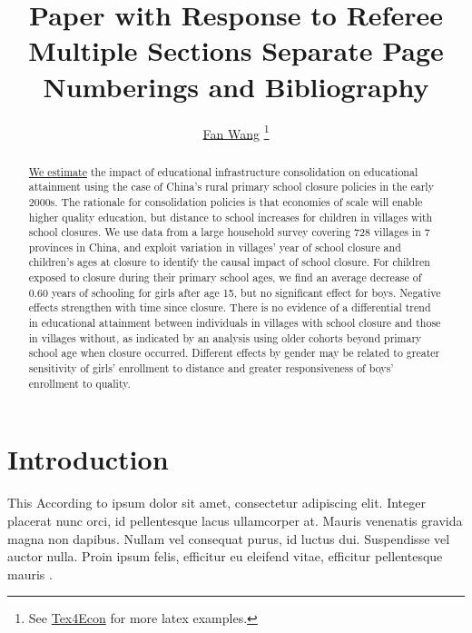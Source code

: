 \documentclass[12pt,english]{article}
\begin{document}
\title{Paper with Response to Referee\\Multiple Sections Separate Page Numberings and Bibliography}

\author{\href{http://fanwangecon.github.io/}{Fan Wang} \thanks{See \href{https://fanwangecon.github.io/Tex4Econ/}{Tex4Econ} for more latex examples.}}


\maketitle
\begin{abstract}
\singlespacing \href{https://papers.ssrn.com/sol3/papers.cfm?abstract_id=3140132}{We estimate} the impact of educational infrastructure consolidation on educational attainment using the case of China’s rural primary school closure policies in the early 2000s. The rationale for consolidation policies is that economies of scale will enable higher quality education, but distance to school increases for children in villages with school closures. We use data from a large household survey covering 728 villages in 7 provinces in China, and exploit variation in villages’ year of school closure and children’s ages at closure to identify the causal impact of school closure. For children exposed to closure during their primary school ages, we find an average decrease of 0.60 years of schooling for girls after age 15, but no significant effect for boys. Negative effects strengthen with time since closure. There is no evidence of a differential trend in educational attainment between individuals in villages with school closure and those in villages without, as indicated by an analysis using older cohorts beyond primary school age when closure occurred. Different effects by gender may be related to greater sensitivity of girls’ enrollment to distance and greater responsiveness of boys’ enrollment to quality.\end{abstract}
\vfill
\pagebreak{}

\section{Introduction}

This According to ipsum dolor sit amet, consectetur adipiscing elit. Integer placerat nunc orci, id pellentesque lacus ullamcorper at. Mauris venenatis gravida magna non dapibus. Nullam vel consequat purus, id luctus dui. Suspendisse vel auctor nulla. Proin ipsum felis, efficitur eu eleifend vitae, efficitur pellentesque mauris \autocite{case_lasting_2005, conti_understanding_2010}.
\end{document}
